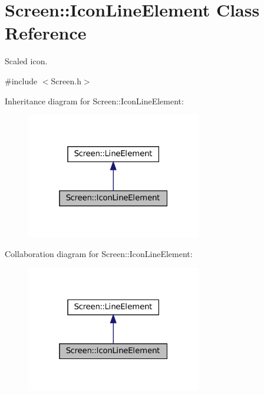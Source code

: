\hypertarget{classScreen_1_1IconLineElement}{}\section{Screen\+:\+:Icon\+Line\+Element Class Reference}
\label{classScreen_1_1IconLineElement}


Scaled icon.  




{\ttfamily \#include $<$Screen.\+h$>$}



Inheritance diagram for Screen\+:\+:Icon\+Line\+Element\+:
\nopagebreak
\begin{figure}[H]
\begin{center}
\leavevmode
\includegraphics[width=217pt]{classScreen_1_1IconLineElement__inherit__graph}
\end{center}
\end{figure}


Collaboration diagram for Screen\+:\+:Icon\+Line\+Element\+:
\nopagebreak
\begin{figure}[H]
\begin{center}
\leavevmode
\includegraphics[width=217pt]{classScreen_1_1IconLineElement__coll__graph}
\end{center}
\end{figure}
